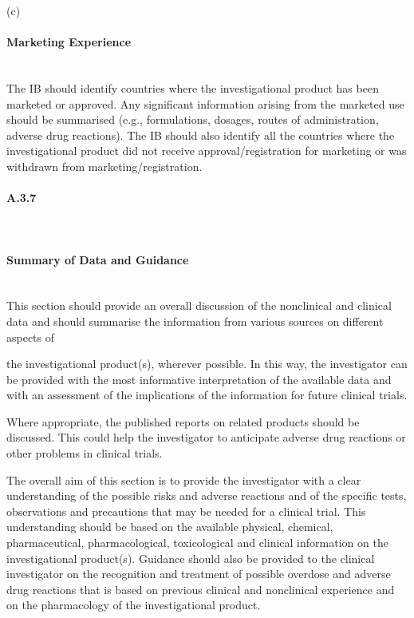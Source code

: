 \documentclass[11pt]{article}
\begin{document}
(c)


\paragraph{Marketing Experience}\mbox{}\\

The IB should identify countries where the investigational product has been marketed or approved. Any significant information arising from the marketed use should be summarised (e.g., formulations, dosages, routes of administration, adverse drug reactions). The IB should also identify all the countries where the investigational product did not receive approval/registration for marketing or was withdrawn from marketing/registration.


\paragraph{A.3.7}\mbox{}\\

\paragraph{Summary of Data and Guidance}\mbox{}\\

This section should provide an overall discussion of the nonclinical and clinical data and should summarise the information from various sources on different aspects of


the investigational product(s), wherever possible. In this way, the investigator can be provided with the most informative interpretation of the available data and with an assessment of the implications of the information for future clinical trials.


Where appropriate, the published reports on related products should be discussed. This could help the investigator to anticipate adverse drug reactions or other problems in clinical trials.


The overall aim of this section is to provide the investigator with a clear understanding of the possible risks and adverse reactions and of the specific tests, observations and precautions that may be needed for a clinical trial. This understanding should be based on the available physical, chemical, pharmaceutical, pharmacological, toxicological and clinical information on the investigational product(s). Guidance should also be provided to the clinical investigator on the recognition and treatment of possible overdose and adverse drug reactions that is based on previous clinical and nonclinical experience and on the pharmacology of the investigational product.
\end{document}
